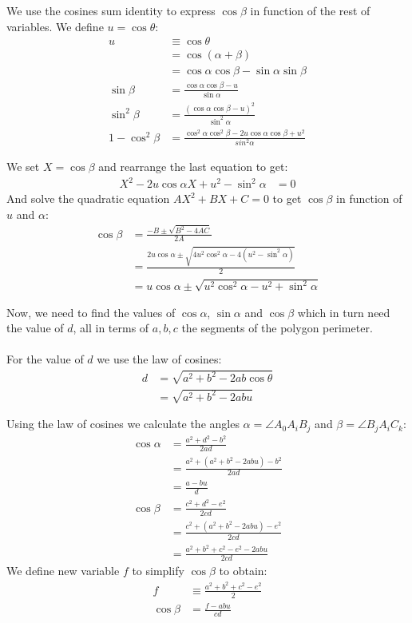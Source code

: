 \documentclass[11pt]{article}
\begin{document}
We use the cosines sum identity to express $\cos\beta$ in function of the rest of variables.
We define $u = \cos\theta$:
\begin{align}
u &\equiv \cos\theta\\
 &= \cos(\alpha + \beta)\\
 &= \cos\alpha\cos\beta - \sin\alpha\sin\beta\\
\sin\beta &= \frac{\cos\alpha\cos\beta - u}{\sin\alpha}\\
\sin^2\beta &= \frac{(\cos\alpha\cos\beta - u)^2}{\sin^2\alpha}\\
1 - \cos^2\beta &= \frac{\cos^2\alpha\cos^2\beta - 2u\cos\alpha\cos\beta + u^2}{sin^2\alpha}
\end{align}

We set $X = \cos\beta$ and rearrange the last equation to get:
\begin{align}
X^2 - 2u\cos\alpha X + u^2 - \sin^2\alpha &= 0
\end{align}
And solve the quadratic equation $AX^2 + BX + C = 0$ to get $\cos\beta$
in function of $u$ and $\alpha$:
\begin{align}
\cos\beta &= \frac{-B \pm \sqrt{B^2 - 4AC}}{2A}\nonumber\\
 &= \frac{2u\cos\alpha \pm 
 \sqrt{4u^2\cos^2\alpha - 4(u^2 -\sin^2\alpha)}}{2}\nonumber\\
 &= u\cos\alpha \pm \sqrt{u^2\cos^2\alpha - u^2 + \sin^2\alpha} \label{eq:cosbeta}
\end{align}

Now, we need to find the values of $\cos\alpha$, $\sin\alpha$ and $\cos\beta$ which
in turn need the value of $d$, all in terms of $a,b,c$ the segments of the polygon perimeter.
\\\\
For the value of $d$ we use the law of cosines:
\begin{align}
d &= \sqrt{a^2 + b^2 - 2ab\cos\theta} \nonumber\\
 &= \sqrt{a^2 + b^2 - 2abu} \label{eq:d}
\end{align}

Using the law of cosines we calculate the angles $\alpha =\angle{A_0A_iB_j}$ 
and $\beta =\angle{B_jA_iC_k}$:
\begin{align}
\cos\alpha &= \frac{a^2 + d^2 - b^2}{2ad} \nonumber\\
 &= \frac{a^2 + (a^2 + b^2 - 2abu) - b^2}{2ad}\nonumber \\
 &= \frac{a - bu}{d}\\
%
\cos\beta &= \frac{c^2 + d^2 - e^2}{2cd}\nonumber\\
 &= \frac{c^2 + (a^2 + b^2 - 2abu) - e^2}{2cd}\nonumber\\
 &= \frac{a^2 + b^2 + c^2 - e^2 - 2abu}{2cd}
\end{align}
We define new variable $f$ to simplify $\cos\beta$ to obtain:
\begin{align}
f &\equiv \frac{a^2 + b^2 + c^2 - e^2}{2} \\
\cos\beta &= \frac{f - abu}{cd}
\end{align}
\end{document}
